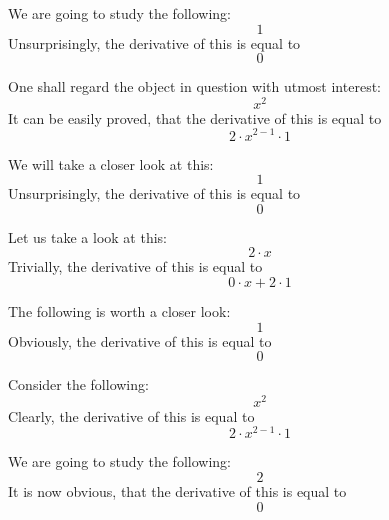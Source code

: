 \documentclass{article}
\begin{document}
We are going to study the following:
\begin{equation}
1 
\end{equation}
Unsurprisingly, the derivative of this is equal to
\begin{equation}
0 
\end{equation}

One shall regard the object in question with utmost interest:
\begin{equation}
x ^{2 } 
\end{equation}
It can be easily proved, that the derivative of this is equal to
\begin{equation}
2 \cdot x ^{2 - 1 } \cdot 1 
\end{equation}

We will take a closer look at this:
\begin{equation}
1 
\end{equation}
Unsurprisingly, the derivative of this is equal to
\begin{equation}
0 
\end{equation}

Let us take a look at this:
\begin{equation}
2 \cdot x 
\end{equation}
Trivially, the derivative of this is equal to
\begin{equation}
0 \cdot x + 2 \cdot 1 
\end{equation}

The following is worth a closer look:
\begin{equation}
1 
\end{equation}
Obviously, the derivative of this is equal to
\begin{equation}
0 
\end{equation}

Consider the following:
\begin{equation}
x ^{2 } 
\end{equation}
Clearly, the derivative of this is equal to
\begin{equation}
2 \cdot x ^{2 - 1 } \cdot 1 
\end{equation}

We are going to study the following:
\begin{equation}
2 
\end{equation}
It is now obvious, that the derivative of this is equal to
\begin{equation}
0 
\end{equation}
\end{document}
